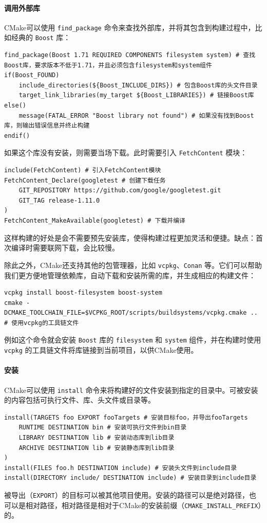 \paragraph{调用外部库} CMake可以使用 \verb|find_package| 命令来查找外部库，并将其包含到构建过程中，比如经典的 \verb|Boost| 库：
\begin{verbatim}
find_package(Boost 1.71 REQUIRED COMPONENTS filesystem system) # 查找Boost库，要求版本不低于1.71，并且必须包含filesystem和system组件
if(Boost_FOUND)
    include_directories(${Boost_INCLUDE_DIRS}) # 包含Boost库的头文件目录
    target_link_libraries(my_target ${Boost_LIBRARIES}) # 链接Boost库
else()
    message(FATAL_ERROR "Boost library not found") # 如果没有找到Boost库，则输出错误信息并终止构建
endif()
\end{verbatim}
如果这个库没有安装，则需要当场下载。此时需要引入 \verb|FetchContent| 模块：
\begin{verbatim}
include(FetchContent) # 引入FetchContent模块
FetchContent_Declare(googletest # 创建下载任务
    GIT_REPOSITORY https://github.com/google/googletest.git
    GIT_TAG release-1.11.0
)
FetchContent_MakeAvailable(googletest) # 下载并编译
\end{verbatim}
这样构建的好处是会不需要预先安装库，使得构建过程更加灵活和便捷。缺点：首次编译时需要联网下载，会比较慢。

除此之外，CMake还支持其他的包管理器，比如 \verb|vcpkg|、\verb|Conan| 等。它们可以帮助我们更方便地管理依赖库，自动下载和安装所需的库，并生成相应的构建文件：
\begin{verbatim}
vcpkg install boost-filesystem boost-system
cmake -DCMAKE_TOOLCHAIN_FILE=$VCPKG_ROOT/scripts/buildsystems/vcpkg.cmake .. # 使用vcpkg的工具链文件
\end{verbatim}
例如这个命令就会安装 \verb|Boost| 库的 \verb|filesystem| 和 \verb|system| 组件，并在构建时使用 \verb|vcpkg| 的工具链文件将库链接到当前项目，以供CMake使用。

\paragraph{安装} 

CMake可以使用 \verb|install| 命令来将构建好的文件安装到指定的目录中。可被安装的内容包括可执行文件、库、头文件或目录等。
\begin{verbatim}
install(TARGETS foo EXPORT fooTargets # 安装目标foo，并导出fooTargets
    RUNTIME DESTINATION bin # 安装可执行文件到bin目录
    LIBRARY DESTINATION lib # 安装动态库到lib目录
    ARCHIVE DESTINATION lib # 安装静态库到lib目录
)
install(FILES foo.h DESTINATION include) # 安装头文件到include目录
install(DIRECTORY include/ DESTINATION include) # 安装目录到include目录
\end{verbatim}
被导出（\verb|EXPORT|）的目标可以被其他项目使用。安装的路径可以是绝对路径，也可以是相对路径，相对路径是相对于CMake的安装前缀（\verb|CMAKE_INSTALL_PREFIX|）的。

